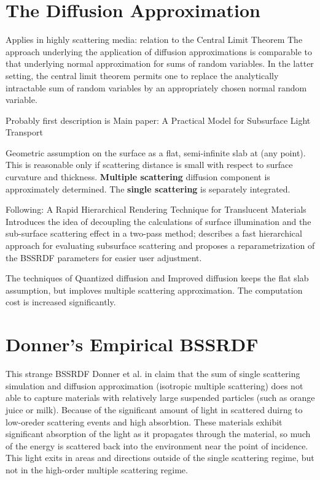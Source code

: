 \section{The Diffusion Approximation}
Applies in highly scattering media: relation to the Central Limit Theorem
The approach underlying the application of diffusion approximations is comparable to that underlying normal approximation for
sums of random variables. In the latter setting, the central limit theorem
permits one to replace the analytically intractable sum of random variables by
an appropriately chosen normal random variable.

Probably first description is \cite{Stam1995}
Main paper: A Practical Model for Subsurface Light Transport \cite{Jensen:2001:PMS:383259.383319}

Geometric assumption on the surface as a flat, semi-infinite slab at (any
point). This is reasonable only if scattering distance is small with respect to
surface curvature and thickness. \textbf{Multiple scattering} diffusion
component is approximately determined. The \textbf{single scattering} is
separately integrated.

Following: A Rapid Hierarchical Rendering Technique for Translucent Materials\\
\cite{Jensen:2002:RHR:566570.566619} Introduces the idea of decoupling the calculations of surface
illumination and the sub-surface scattering effect in a two-pass method;
describes a fast hierarchical approach for evaluating subsurface scattering
and proposes a reparametrization of the BSSRDF parameters for easier user adjustment.

The techniques of Quantized diffusion \cite{D'Eon:2011:QMR:1964921.1964951} and
Improved diffusion \cite{Habel:2013:PBD:2600890.2600896} keeps the flat slab
assumption, but imploves multiple scattering approximation. The computation cost
is increased significantly.

\section{Donner's Empirical BSSRDF}
This strange \gls{BSSRDF}
Donner et al. in \cite{Donner:2009:EBM} claim that the sum of single scattering
simulation and diffusion approximation (isotropic multiple scattering) does not
able to capture materials with relatively large suspended particles (such as
orange juice or milk). Because of the significant amount of light in scattered
duirng to low-oreder scattering events and high absorbtion.
These materials exhibit significant absorption of the light as it propagates
through the material, so much of the energy is scattered back into
the environment near the point of incidence. This light exits in areas and
directions outside of the single scattering regime, but not in the high-order
multiple scattering regime.

